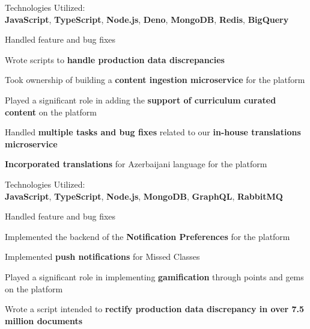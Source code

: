 \documentclass[]{deedy-resume-openfont}
\begin{document}
\begin{minipage}[t]{0.66\textwidth}
\sectionsep
\begin{tightemize}
\item Technologies Utilized: \\\textbf{JavaScript}, \textbf{TypeScript}, \textbf{Node.js}, \textbf{Deno}, \textbf{MongoDB}, \textbf{Redis}, \textbf{BigQuery}
\item Handled feature and bug fixes
\item Wrote scripts to \textbf{handle production data discrepancies}
\item Took ownership of building a \textbf{content ingestion microservice} for the platform
\item Played a significant role in adding the \textbf{support of curriculum curated content} on the platform
\item Handled \textbf{multiple tasks and bug fixes} related to our \textbf{in-house translations microservice}
\item \textbf{Incorporated translations} for Azerbaijani language for the platform
\end{tightemize}
\sectionsep


\sectionsep
\begin{tightemize}
\item Technologies Utilized: \\\textbf{JavaScript}, \textbf{TypeScript}, \textbf{Node.js}, \textbf{MongoDB}, \textbf{GraphQL}, \textbf{RabbitMQ}
\item Handled feature and bug fixes
\item Implemented the backend of the \textbf{Notification Preferences} for the platform
\item Implemented \textbf{push notifications} for Missed Classes
\item Played a significant role in implementing \textbf{gamification} through points and gems on the platform
\item Wrote a script intended to \textbf{rectify production data discrepancy in over 7.5 million documents}
\end{tightemize}


\end{minipage}
\end{document}
